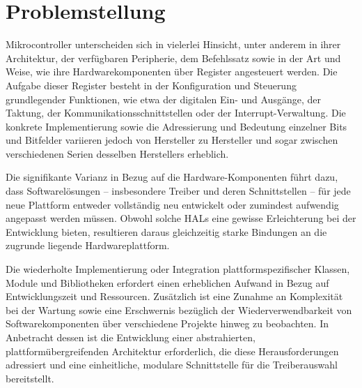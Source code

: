 \section{Problemstellung}

%
%
Mikrocontroller unterscheiden sich in vielerlei Hinsicht, unter anderem in ihrer Architektur, der verfügbaren Peripherie, dem Befehlssatz sowie in der Art und Weise, wie ihre Hardwarekomponenten über Register angesteuert werden.
Die Aufgabe dieser Register besteht in der Konfiguration und Steuerung grundlegender Funktionen, wie etwa der digitalen Ein- und Ausgänge, der Taktung, der Kommunikationsschnittstellen oder der Interrupt-Verwaltung.
Die konkrete Implementierung sowie die Adressierung und Bedeutung einzelner Bits und Bitfelder variieren jedoch von Hersteller zu Hersteller und sogar zwischen verschiedenen Serien desselben Herstellers erheblich.

Die signifikante Varianz in Bezug auf die Hardware-Komponenten führt dazu, dass Softwarelösungen – insbesondere Treiber und deren Schnittstellen – für jede neue Plattform entweder vollständig neu entwickelt oder zumindest aufwendig angepasst werden müssen.
Obwohl solche HALs eine gewisse Erleichterung bei der Entwicklung bieten, resultieren daraus gleichzeitig starke Bindungen an die zugrunde liegende Hardwareplattform.

Die wiederholte Implementierung oder Integration plattformspezifischer Klassen, Module und Bibliotheken erfordert einen erheblichen Aufwand in Bezug auf Entwicklungszeit und Ressourcen.
Zusätzlich ist eine Zunahme an Komplexität bei der Wartung sowie eine Erschwernis bezüglich der Wiederverwendbarkeit von Softwarekomponenten über verschiedene Projekte hinweg zu beobachten.
 In Anbetracht dessen ist die Entwicklung einer abstrahierten, plattformübergreifenden Architektur erforderlich, die diese Herausforderungen adressiert und eine einheitliche, modulare Schnittstelle für die Treiberauswahl bereitstellt.




